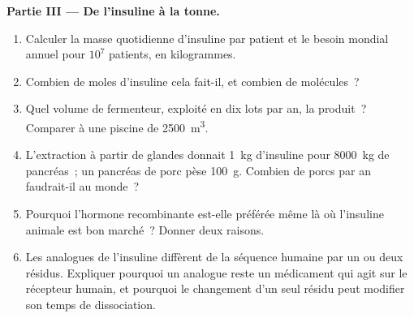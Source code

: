 \begin{problem}
\medskip
\noindent\textbf{Partie III --- De l'insuline à la tonne.}
\begin{enumerate}[resume]
  \item Calculer la masse quotidienne d'insuline par patient et le
        besoin mondial annuel pour $10^{7}$ patients, en kilogrammes.
  \item Combien de moles d'insuline cela fait-il, et combien de
        molécules~?
  \item Quel volume de fermenteur, exploité en dix lots par an, la
        produit~? Comparer à une piscine de \qty{2500}{m^3}.
  \item L'extraction à partir de glandes donnait \qty{1}{kg}
        d'insuline pour \qty{8000}{kg} de pancréas~; un pancréas de
        porc pèse \qty{100}{g}. Combien de porcs par an faudrait-il au
        monde~?
  \item Pourquoi l'hormone recombinante est-elle préférée même là où
        l'insuline animale est bon marché~? Donner deux raisons.
  \item Les analogues de l'insuline diffèrent de la séquence humaine
        par un ou deux résidus. Expliquer pourquoi un analogue reste un
        médicament qui agit sur le récepteur humain, et pourquoi le
        changement d'un seul résidu peut modifier son temps de
        dissociation.
\end{enumerate}


\end{problem}
